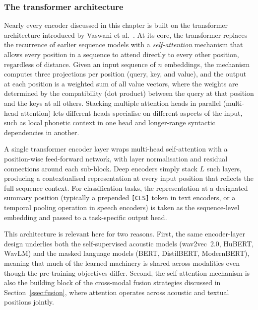 \subsubsection{The transformer architecture}
\label{ssec:transformer}

Nearly every encoder discussed in this chapter is built on the transformer architecture introduced by Vaswani et al.~\cite{vaswani2017attention}.
At its core, the transformer replaces the recurrence of earlier sequence models with a \emph{self-attention} mechanism that allows every position in a sequence to attend directly to every other position, regardless of distance.
Given an input sequence of $n$ embeddings, the mechanism computes three projections per position (query, key, and value), and the output at each position is a weighted sum of all value vectors, where the weights are determined by the compatibility (dot product) between the query at that position and the keys at all others.
Stacking multiple attention heads in parallel (multi-head attention) lets different heads specialise on different aspects of the input, such as local phonetic context in one head and longer-range syntactic dependencies in another.

A single transformer encoder layer wraps multi-head self-attention with a position-wise feed-forward network, with layer normalisation and residual connections around each sub-block.
Deep encoders simply stack $L$ such layers, producing a contextualised representation at every input position that reflects the full sequence context.
For classification tasks, the representation at a designated summary position (typically a prepended \texttt{[CLS]} token in text encoders, or a temporal pooling operation in speech encoders) is taken as the sequence-level embedding and passed to a task-specific output head.

This architecture is relevant here for two reasons.
First, the same encoder-layer design underlies both the self-supervised acoustic models (wav2vec~2.0, HuBERT, WavLM) and the masked language models (BERT, DistilBERT, ModernBERT), meaning that much of the learned machinery is shared across modalities even though the pre-training objectives differ.
Second, the self-attention mechanism is also the building block of the cross-modal fusion strategies discussed in Section~\ref{ssec:fusion}, where attention operates across acoustic and textual positions jointly.

